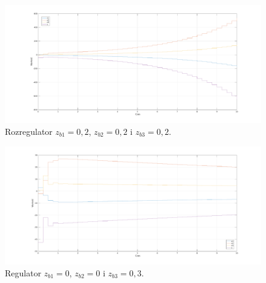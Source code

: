 \begin{itemize}
\begin{figure}[H]
\centering
 \includegraphics[width=\textwidth]{img/plot5_5.pdf}
\caption{Rozregulator $z_{b1}=0,2$, $z_{b2}=0,2$ i $z_{b3}=0,2$.}
\end{figure}

\begin{figure}[H]
\centering
 \includegraphics[width=\textwidth]{img/plot5_6.pdf}
\caption{Regulator $z_{b1}=0$, $z_{b2}=0$ i $z_{b3}=0,3$.}
\end{figure}


\end{itemize}


